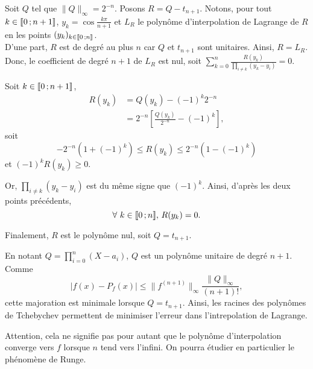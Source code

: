 \begin{solution}
\begin{questions}
Soit $Q$ tel que $\|Q\|_\infty = 2^{-n}$. Posons $R = Q - t_{n+1}$. Notons, pour tout $k \in \llbracket 0\,; n+1 \rrbracket$, $y_k = \cos \frac{k\pi}{n+1}$ et $L_R$ le polynôme d'interpolation de Lagrange de $R$ en les points $(y_k)_{k\in\llbracket 0\,; n \rrbracket}$. \\
D'une part, $R$ est de degré au plus $n$ car $Q$ et $t_{n+1}$ sont unitaires. Ainsi, $R = L_R$. Donc, le coefficient de degré $n+1$ de $L_R$ est nul, soit $\sum_{k=0}^n \frac{R(y_k)}{\prod_{i\neq k} (y_k-y_i)} = 0$.

Soit $k \in \llbracket 0\,; n+1 \rrbracket$,
\begin{align*}
R(y_k) &= Q(y_k) - (-1)^k 2^{-n} \\
&= 2^{-n} \left[\frac{Q(y_k)}{2^{-n}} - (-1)^k\right],
\end{align*}
soit
\[
-2^{-n} (1 + (-1)^k) \leq R(y_k) \leq 2^{-n} (1 - (-1)^k)
\]
et $(-1)^k R(y_k) \geq 0$.

Or, $\prod_{i\neq k} (y_k-y_i)$ est du même signe que $(-1)^k$. Ainsi, d'après les deux points précédents,
\[
\forall\, k \in \interent{0}{n},\, R(y_k) = 0.
\]

Finalement, $R$ est le polynôme nul, soit
{
$Q = t_{n+1}$.
}

\item En notant $Q = \prod_{i=0}^n (X-a_i)$, $Q$ est un polynôme unitaire de degré $n+1$. Comme
\[
|f(x) - P_f(x)| \leq \|f^{(n+1)}\|_\infty \frac{\|Q\|_\infty}{(n+1)!},
\]
cette majoration est minimale lorsque $Q = t_{n+1}$. Ainsi, les racines des polynômes de Tchebychev permettent de minimiser l'erreur dans l'intrepolation de Lagrange.

Attention, cela ne signifie pas pour autant que le polynôme d'interpolation converge vers $f$ lorsque $n$ tend vers l'infini. On pourra étudier en particulier le phénomène de Runge.
\end{questions}
\end{solution}